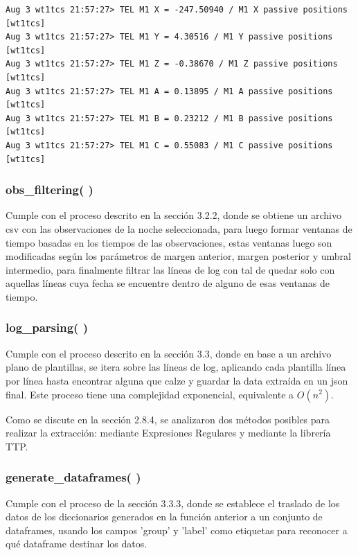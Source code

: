 \begin{listing}[!ht]
    \caption{\label{myverbatim:lines_after} Ejemplos de líneas posteriores a log\_formatting( )}
    \begin{verbatim}
Aug 3 wt1tcs 21:57:27> TEL M1 X = -247.50940 / M1 X passive positions [wt1tcs]
Aug 3 wt1tcs 21:57:27> TEL M1 Y = 4.30516 / M1 Y passive positions [wt1tcs]
Aug 3 wt1tcs 21:57:27> TEL M1 Z = -0.38670 / M1 Z passive positions [wt1tcs]
Aug 3 wt1tcs 21:57:27> TEL M1 A = 0.13895 / M1 A passive positions [wt1tcs]
Aug 3 wt1tcs 21:57:27> TEL M1 B = 0.23212 / M1 B passive positions [wt1tcs]
Aug 3 wt1tcs 21:57:27> TEL M1 C = 0.55083 / M1 C passive positions [wt1tcs]
    \end{verbatim}
\end{listing}

\subsubsection{obs\_filtering( )}
Cumple con el proceso descrito en la sección 3.2.2, donde se obtiene un archivo csv con las observaciones de la noche seleccionada, para luego formar ventanas de tiempo basadas en los tiempos de las  observaciones, estas ventanas luego son modificadas según los parámetros de margen anterior, margen posterior y umbral intermedio, para finalmente filtrar las líneas de log con tal de quedar solo con aquellas líneas cuya fecha se encuentre dentro de alguno de esas ventanas de tiempo.

\subsubsection{log\_parsing( )}
Cumple con el proceso descrito en la sección 3.3, donde en base a un archivo plano de plantillas, se itera sobre las líneas de log, aplicando cada plantilla línea por línea hasta encontrar alguna que calze y guardar la data extraída en un json final. Este proceso tiene una complejidad exponencial, equivalente a $ O(n^2)$.

Como se discute en la sección 2.8.4, se analizaron dos métodos posibles para realizar la extracción: mediante Expresiones Regulares y mediante la librería TTP.

\subsubsection{generate\_dataframes( )} 
Cumple con el proceso de la sección 3.3.3, donde se establece el traslado de los datos de los diccionarios generados en la función anterior a un conjunto de dataframes, usando los campos 'group' y 'label' como etiquetas para reconocer a qué dataframe destinar los datos.

